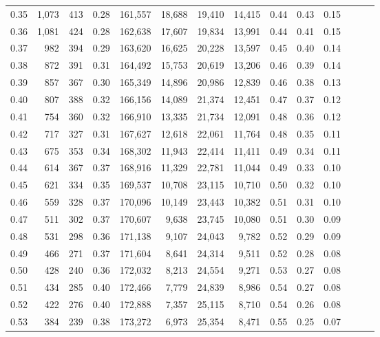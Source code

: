 \begin{tabular}{rrrrrrrrrrrrrr}
0.35 &   1,073 &  413 &  0.28 &  161,557 &   18,688 &  19,410 &  14,415 &  0.44 &  0.43 &      0.15 \\
0.36 &   1,081 &  424 &  0.28 &  162,638 &   17,607 &  19,834 &  13,991 &  0.44 &  0.41 &      0.15 \\
0.37 &     982 &  394 &  0.29 &  163,620 &   16,625 &  20,228 &  13,597 &  0.45 &  0.40 &      0.14 \\
0.38 &     872 &  391 &  0.31 &  164,492 &   15,753 &  20,619 &  13,206 &  0.46 &  0.39 &      0.14 \\
0.39 &     857 &  367 &  0.30 &  165,349 &   14,896 &  20,986 &  12,839 &  0.46 &  0.38 &      0.13 \\
0.40 &     807 &  388 &  0.32 &  166,156 &   14,089 &  21,374 &  12,451 &  0.47 &  0.37 &      0.12 \\
0.41 &     754 &  360 &  0.32 &  166,910 &   13,335 &  21,734 &  12,091 &  0.48 &  0.36 &      0.12 \\
0.42 &     717 &  327 &  0.31 &  167,627 &   12,618 &  22,061 &  11,764 &  0.48 &  0.35 &      0.11 \\
0.43 &     675 &  353 &  0.34 &  168,302 &   11,943 &  22,414 &  11,411 &  0.49 &  0.34 &      0.11 \\
0.44 &     614 &  367 &  0.37 &  168,916 &   11,329 &  22,781 &  11,044 &  0.49 &  0.33 &      0.10 \\
0.45 &     621 &  334 &  0.35 &  169,537 &   10,708 &  23,115 &  10,710 &  0.50 &  0.32 &      0.10 \\
0.46 &     559 &  328 &  0.37 &  170,096 &   10,149 &  23,443 &  10,382 &  0.51 &  0.31 &      0.10 \\
0.47 &     511 &  302 &  0.37 &  170,607 &    9,638 &  23,745 &  10,080 &  0.51 &  0.30 &      0.09 \\
0.48 &     531 &  298 &  0.36 &  171,138 &    9,107 &  24,043 &   9,782 &  0.52 &  0.29 &      0.09 \\
0.49 &     466 &  271 &  0.37 &  171,604 &    8,641 &  24,314 &   9,511 &  0.52 &  0.28 &      0.08 \\
0.50 &     428 &  240 &  0.36 &  172,032 &    8,213 &  24,554 &   9,271 &  0.53 &  0.27 &      0.08 \\
0.51 &     434 &  285 &  0.40 &  172,466 &    7,779 &  24,839 &   8,986 &  0.54 &  0.27 &      0.08 \\
0.52 &     422 &  276 &  0.40 &  172,888 &    7,357 &  25,115 &   8,710 &  0.54 &  0.26 &      0.08 \\
0.53 &     384 &  239 &  0.38 &  173,272 &    6,973 &  25,354 &   8,471 &  0.55 &  0.25 &      0.07 \\

\end{tabular}
